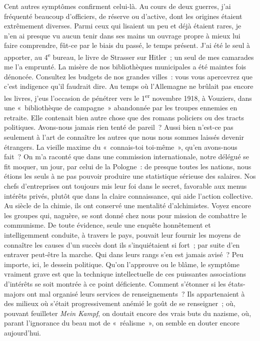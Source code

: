 \documentclass[french,twoside]{book} %
\begin{document}
Cent autres symptômes confirment celui-là. Au cours de deux guerres, j’ai fréquenté beaucoup d’officiers, de réserve ou d’active, dont les origines étaient extrêmement diverses. Parmi ceux qui lisaient un peu et déjà étaient rares, je n’en ai presque vu aucun tenir dans ses mains un ouvrage propre à mieux lui faire comprendre, fût-ce par le biais du passé, le temps présent. J’ai été le seul à apporter, au 4\textsuperscript{e} bureau, le livre de Strasser sur Hitler ; un seul de mes camarades me l’a emprunté. La misère de nos bibliothèques municipales a été maintes fois dénoncée. Consultez les budgets de nos grandes villes : vous vous apercevrez que c’est indigence qu’il faudrait dire. Au temps où l’Allemagne ne brûlait pas encore les livres, j’eus l’occasion de pénétrer vers le 1\textsuperscript{er} novembre 1918, à Vouziers, dans une « bibliothèque de campagne » abandonnée par les troupes ennemies en retraite. Elle contenait bien autre chose que des romans policiers ou des tracts politiques. Avons-nous jamais rien tenté de pareil ? Aussi bien n’est-ce pas seulement à l’art de connaître les autres que nous nous sommes laissés devenir étrangers. La vieille maxime du « connais-toi toi-même », qu’en avons-nous fait ? On m’a raconté que dans une commission internationale, notre délégué se fit moquer, un jour, par celui de la Pologne : de presque toutes les nations, nous étions les seuls à ne pas pouvoir produire une statistique sérieuse des salaires. Nos chefs d’entreprises ont toujours mis leur foi dans le secret, favorable aux menus intérêts privés, plutôt que dans la claire connaissance, qui aide l’action collective. Au siècle de la chimie, ils ont conservé une mentalité d’alchimistes. Voyez   encore les groupes qui, naguère, se sont donné chez nous pour mission de combattre le communisme. De toute évidence, seule une enquête honnêtement et intelligemment conduite, à travers le pays, pouvait leur fournir les moyens de connaître les causes d’un succès dont ils s’inquiétaient si fort ; par suite d’en entraver peut-être la marche. Qui dans leurs rangs s’en est jamais avisé ? Peu importe, ici, le dessein politique. Qu’on l’approuve ou le blâme, le symptôme vraiment grave est que la technique intellectuelle de ces puissantes associations d’intérêts se soit montrée à ce point déficiente. Comment s’étonner si les états-majors ont mal organisé leurs services de renseignements ? Ils appartenaient à des milieux où s’était progressivement anémié le goût de se renseigner ; où, pouvant feuilleter {\itshape Mein Kampf}, on doutait encore des vrais buts du nazisme, où, parant l’ignorance du beau mot de « réalisme », on semble en douter encore aujourd’hui.\par
\end{document}
